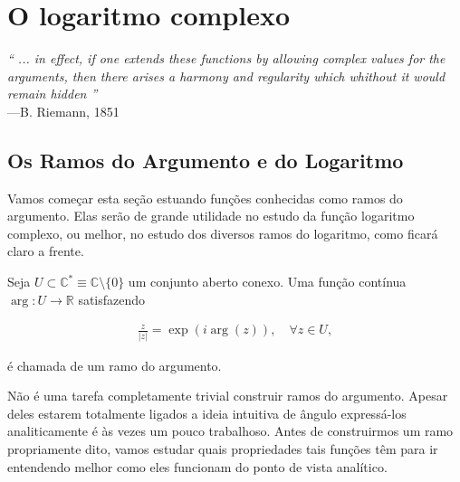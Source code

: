 \chapter[O logaritmo complexo]{O logaritmo complexo}
\chaptermark{}

\hfill%
\begin{minipage}{13cm}
\begin{flushright}
\rightskip=0.5cm
\textit{``
	... in effect, if one extends these functions by allowing complex values for the arguments, then 
	there arises a harmony and regularity which whithout it would remain hidden ''}
\\[0.1cm]
\rightskip=0.5cm
---B. Riemann, 1851
\end{flushright}
\end{minipage}




\section{Os Ramos do Argumento e do Logaritmo}

Vamos começar esta seção estuando funções conhecidas como ramos do argumento.
Elas serão de grande utilidade no estudo da função logaritmo complexo, ou melhor,
no estudo dos diversos ramos do logaritmo, como ficará claro a frente.

\begin{definicao}
\label{def-ramo-argumento}
Seja $U\subset \mathbb{C}^{*}\equiv \mathbb{C}\setminus\{0\}$ um conjunto aberto conexo. Uma função contínua $\arg:U\to\mathbb{R}$
satisfazendo 

\begin{align}\label{def-eq-ramo}
\frac{z}{|z|}=\exp(i\arg(z)), \quad \forall z\in U,
\end{align}

é chamada de um ramo do argumento.
\end{definicao}


Não é uma tarefa completamente trivial construir ramos do argumento. Apesar 
deles estarem totalmente ligados a ideia intuitiva de ângulo expressá-los
analiticamente é às vezes um pouco trabalhoso. Antes de construirmos um ramo
propriamente dito, vamos estudar quais propriedades tais funções têm para
ir entendendo melhor como eles funcionam do ponto de vista analítico. 

